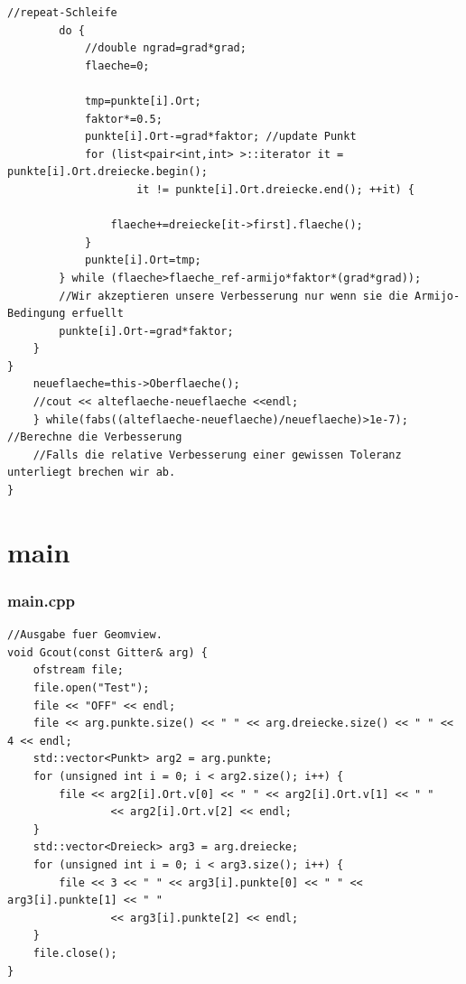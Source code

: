 \documentclass{beamer}
\begin{document}
\begin{frame}[fragile]
\begin{lstlisting}
//repeat-Schleife
		do {
			//double ngrad=grad*grad;
			flaeche=0;

			tmp=punkte[i].Ort;
			faktor*=0.5;
			punkte[i].Ort-=grad*faktor; //update Punkt
			for (list<pair<int,int> >::iterator it = punkte[i].Ort.dreiecke.begin();
					it != punkte[i].Ort.dreiecke.end(); ++it) {

				flaeche+=dreiecke[it->first].flaeche();
			}
			punkte[i].Ort=tmp;
		} while (flaeche>flaeche_ref-armijo*faktor*(grad*grad));
		//Wir akzeptieren unsere Verbesserung nur wenn sie die Armijo-Bedingung erfuellt
		punkte[i].Ort-=grad*faktor;
	}
}
	neueflaeche=this->Oberflaeche();
	//cout << alteflaeche-neueflaeche <<endl;
	} while(fabs((alteflaeche-neueflaeche)/neueflaeche)>1e-7); //Berechne die Verbesserung
	//Falls die relative Verbesserung einer gewissen Toleranz unterliegt brechen wir ab.
}
\end{lstlisting}
\end{frame}

\section{main}

\begin{frame}[fragile]

\frametitle{main.cpp}

\begin{lstlisting}
//Ausgabe fuer Geomview.
void Gcout(const Gitter& arg) {
	ofstream file;
	file.open("Test");
	file << "OFF" << endl;
	file << arg.punkte.size() << " " << arg.dreiecke.size() << " " << 4 << endl;
	std::vector<Punkt> arg2 = arg.punkte;
	for (unsigned int i = 0; i < arg2.size(); i++) {
		file << arg2[i].Ort.v[0] << " " << arg2[i].Ort.v[1] << " "
				<< arg2[i].Ort.v[2] << endl;
	}
	std::vector<Dreieck> arg3 = arg.dreiecke;
	for (unsigned int i = 0; i < arg3.size(); i++) {
		file << 3 << " " << arg3[i].punkte[0] << " " << arg3[i].punkte[1] << " "
				<< arg3[i].punkte[2] << endl;
	}
	file.close();
}
\end{lstlisting}
\end{frame}
\end{document}
